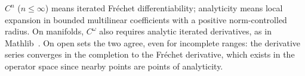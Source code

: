 $C^n$ ($n\le\infty$) means iterated Fr\'echet differentiability; analyticity means local expansion in bounded
multilinear coefficients with a positive norm-controlled radius. On manifolds, $C^\omega$ also requires analytic
iterated derivatives, as in Mathlib~\cite{docs}. On open sets the two agree, even for incomplete ranges: the
derivative series converges in the completion to the Fr\'echet derivative, which exists in the operator space since
nearby points are points of analyticity.
